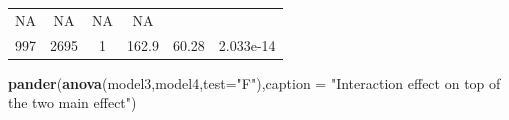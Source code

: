 \documentclass[]{article}
\newenvironment{Shaded}{\begin{snugshade}}{\end{snugshade}}
\newcommand{\KeywordTok}[1]{\textcolor[rgb]{0.13,0.29,0.53}{\textbf{#1}}}
\newcommand{\DataTypeTok}[1]{\textcolor[rgb]{0.13,0.29,0.53}{#1}}
\newcommand{\StringTok}[1]{\textcolor[rgb]{0.31,0.60,0.02}{#1}}
\newcommand{\NormalTok}[1]{#1}
\begin{document}
\begin{longtable}[]{@{}cccccc@{}}
\begin{minipage}[t]{0.06\columnwidth}
NA\strut
\end{minipage} & \begin{minipage}[t]{0.14\columnwidth}\centering\strut
NA\strut
\end{minipage} & \begin{minipage}[t]{0.09\columnwidth}\centering\strut
NA\strut
\end{minipage} & \begin{minipage}[t]{0.13\columnwidth}\centering\strut
NA\strut
\end{minipage}\tabularnewline
\begin{minipage}[t]{0.10\columnwidth}\centering\strut
997\strut
\end{minipage} & \begin{minipage}[t]{0.08\columnwidth}\centering\strut
2695\strut
\end{minipage} & \begin{minipage}[t]{0.06\columnwidth}\centering\strut
1\strut
\end{minipage} & \begin{minipage}[t]{0.14\columnwidth}\centering\strut
162.9\strut
\end{minipage} & \begin{minipage}[t]{0.09\columnwidth}\centering\strut
60.28\strut
\end{minipage} & \begin{minipage}[t]{0.13\columnwidth}\centering\strut
2.033e-14\strut
\end{minipage}\tabularnewline
\bottomrule
\end{longtable}

\begin{Shaded}
\begin{Highlighting}[]
\KeywordTok{pander}\NormalTok{(}\KeywordTok{anova}\NormalTok{(model3,model4,}\DataTypeTok{test=}\StringTok{"F"}\NormalTok{),}\DataTypeTok{caption =} \StringTok{"Interaction effect on top of the two main effect"}\NormalTok{)}
\end{Highlighting}
\end{Shaded}
\end{document}
